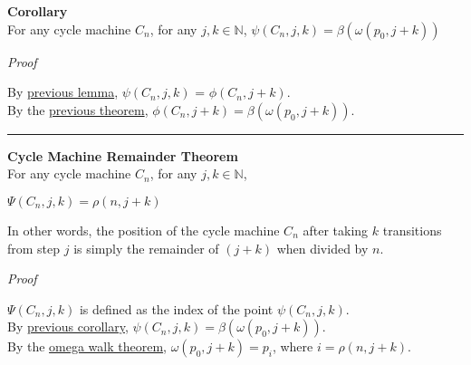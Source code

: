 \documentclass[a4paper,12pt]{article}
\begin{document}
\label{corollary:bridged_state_function}
\hypertarget{corollary:bridged_state_function}{}
\begin{tcolorbox}
\textbf{Corollary}\\
For any cycle machine $C_n$, for any $j, k \in \mathbb{N}$, $\psi(C_n, j, k) = \beta(\omega(p_0, j + k))$
\end{tcolorbox}

\noindent
\textit{Proof}

\noindent By \hyperlink{lemma:psi_well_defined}{previous lemma}, $\psi(C_n, j, k)$ = $\phi(C_n, j + k)$.\\

\noindent By the \hyperlink{theorem:bridge_theorem}{previous theorem}, $\phi(C_n, j + k) = \beta(\omega(p_0, j + k))$.

\begin{center}
\noindent\rule{8cm}{0.4pt}
\end{center}








\label{theorem:cycle_machine_remainder_theorem}
\hypertarget{theorem:cycle_machine_remainder_theorem}{}
\begin{tcolorbox}
\textbf{Cycle Machine Remainder Theorem}\\
For any cycle machine $C_n$, for any $j, k \in \mathbb{N}$,

\begin{center}
$\Psi(C_n, j, k) = \rho(n, j + k)$
\end{center}

\noindent In other words, the position of the cycle machine $C_n$ after taking $k$ transitions from step $j$ is simply the remainder of $(j + k)$ when divided by $n$.

\end{tcolorbox}

\noindent
\textit{Proof}

\noindent $\Psi(C_n, j, k)$ is defined as the index of the point $\psi(C_n, j, k)$.\\

\noindent By \hyperlink{corollary:bridged_state_function}{previous corollary}, $\psi(C_n, j, k) = \beta(\omega(p_0, j + k))$.\\

\noindent By the \hyperlink{theorem:omega_walk_theorem}{omega walk theorem}, $\omega(p_0, j + k) = p_i$, where $i = \rho(n, j + k)$.\\
\end{document}
